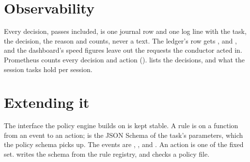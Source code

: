 \section{Observability}

Every decision, passes included, is one journal row and one \code{[conductor]} log line with the task, the decision, the reason and counts, never a text. The ledger's  row gets ,  and , and the dashboard's speed figures leave out the requests the conductor acted in. Prometheus counts every decision and action ().  lists the decisions, and  what the session tasks hold per session.

\section{Extending it}

The interface the policy engine builds on is kept stable. A rule is  on a function from an event to an action;  is the JSON Schema of the task's parameters, which the policy schema picks up. The events are , ,  and . An action is one of the fixed set.  writes the schema from the rule registry, and  checks a policy file.
